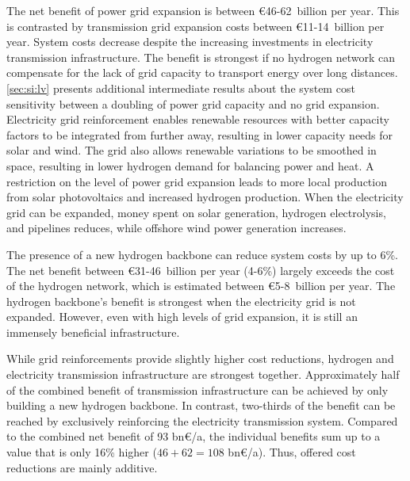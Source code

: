 
The net benefit of power grid expansion is between \euro46-62~billion per year.
This is contrasted by transmission grid expansion costs between
\euro11-14~billion per year. System costs decrease despite the increasing
investments in electricity transmission infrastructure. The benefit is strongest
if no hydrogen network can compensate for the lack of grid capacity to transport
energy over long distances. \cref{sec:si:lv} presents additional intermediate
results about the system cost sensitivity between a doubling of power grid
capacity and no grid expansion. Electricity grid reinforcement enables renewable
resources with better capacity factors to be integrated from further away,
resulting in lower capacity needs for solar and wind. The grid also allows
renewable variations to be smoothed in space, resulting in lower hydrogen demand
for balancing power and heat. A restriction on the level of power grid expansion
leads to more local production from solar photovoltaics and increased hydrogen
production. When the electricity grid can be expanded, money spent on solar
generation, hydrogen electrolysis, and pipelines reduces, while offshore wind
power generation increases.



The presence of a new hydrogen backbone can reduce system costs by up to 6\%.
The net benefit between \euro31-46~billion per year (4-6\%) largely exceeds the
cost of the hydrogen network, which is estimated between \euro5-8~billion per
year. The hydrogen backbone's benefit is strongest when the electricity grid is
not expanded. However, even with high levels of grid expansion, it is still an
immensely beneficial infrastructure.


While grid reinforcements provide slightly higher cost reductions, hydrogen and
electricity transmission infrastructure are strongest together. Approximately
half of the combined benefit of transmission infrastructure can be achieved by
only building a new hydrogen backbone. In contrast, two-thirds of the benefit
can be reached by exclusively reinforcing the electricity transmission system.
Compared to the combined net benefit of 93 bn\euro/a, the individual benefits
sum up to a value that is only 16\% higher ($46+62=108$ bn\euro/a). Thus,
offered cost reductions are mainly additive.

